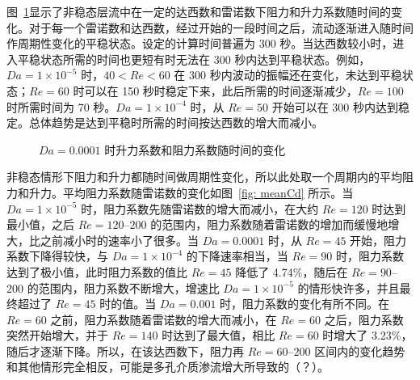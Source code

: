 图~\ref{fig: ClCd_t-1e-4}显示了非稳态层流中在一定的达西数和雷诺数下阻力和升力系数随时间的变化。对于每一个雷诺数和达西数，经过开始的一段时间之后，流动逐渐进入随时间作周期性变化的平稳状态。设定的计算时间普遍为 300 秒。当达西数较小时，进入平稳状态所需的时间也更短有时无法在 300 秒内达到平稳状态。例如，$Da=1\times 10^{-5}$ 时，$40<Re<60$ 在 300 秒内波动的振幅还在变化，未达到平稳状态；$Re=60$ 时可以在 150 秒时稳定下来，此后所需的时间逐渐减少，$Re=100$ 时所需时间为 70 秒。$Da=1\times 10^{-4}$ 时，从 $Re=50$ 开始可以在 300 秒内达到稳定。总体趋势是达到平稳时所需的时间按达西数的增大而减小。

\begin{figure}
	\setlength{\subfigcapskip}{-1bp}
	\centering
	\begin{minipage}{\textwidth}
		\centering
	\end{minipage}
	\centering
	\begin{minipage}{\textwidth}
		\centering
	\end{minipage}
	\centering
	\begin{minipage}{\textwidth}
		\centering
	\end{minipage}
	\centering
	\begin{minipage}{\textwidth}
		\centering
	\end{minipage}
	\vspace{0.2em}
	\caption{$Da=0.0001$ 时升力系数和阻力系数随时间的变化}
	\label{fig: ClCd_t-1e-4}
\end{figure}

非稳态情形下阻力和升力都随时间做周期性变化，所以此处取一个周期内的平均阻力和升力。平均阻力系数随雷诺数的变化如图~\ref{fig: meanCd} 所示。当 $Da=1\times 10^{-5}$ 时，阻力系数先随雷诺数的增大而减小，在大约 $Re=120$ 时达到最小值，之后 $Re=120$--$200$ 的范围内，阻力系数随着雷诺数的增加而缓慢地增大，比之前减小时的速率小了很多。当 $Da=0.0001$ 时，从 $Re=45$ 开始，阻力系数下降得较快，与 $Da=1\times 10^{-4}$ 的下降速率相当，当 $Re=90$ 时，阻力系数达到了极小值，此时阻力系数的值比 $Re=45$ 降低了 4.74\%，随后在 $Re=90$--$200$ 的范围内，阻力系数不断增大，增速比 $Da=1\times 10^{-5}$ 的情形快许多，并且最终超过了 $Re=45$ 时的值。当 $Da=0.001$ 时，阻力系数的变化有所不同。在 $Re=60$ 之前，阻力系数随着雷诺数的增大而减小，在 $Re=60$ 之后，阻力系数突然开始增大，并于 $Re=140$ 时达到了最大值，相比 $Re=60$ 时增大了 3.23\%，随后才逐渐下降。所以，在该达西数下，阻力再 $Re=60$--$200$ 区间内的变化趋势和其他情形完全相反，可能是多孔介质渗流增大所导致的（？）。

